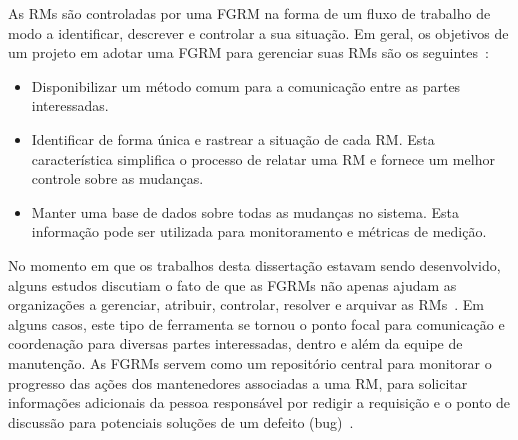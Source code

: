 
As RMs são controladas por uma FGRM na forma de um fluxo de trabalho de modo a
identificar, descrever e controlar a sua situação. Em geral, os objetivos de um
projeto em adotar uma FGRM para gerenciar suas RMs são os
seguintes~\cite{tripathy2014software}:

\begin{itemize}
    \item Disponibilizar um método comum para a comunicação entre as partes
        interessadas.
	\item Identificar de forma única e rastrear a situação de cada RM\@. Esta
		característica simplifica o processo de relatar uma RM e fornece um
		melhor controle sobre as mudanças.
    \item Manter uma base de dados sobre todas as mudanças no sistema. Esta
        informação pode ser utilizada para monitoramento e métricas de medição.
\end{itemize}

No momento em que os trabalhos desta dissertação estavam sendo desenvolvido,
alguns estudos discutiam o fato de que as FGRMs não apenas ajudam as
organizações a gerenciar, atribuir, controlar, resolver e arquivar as
RMs~\cite{Bertram:2010:CCB:1718918.1718972}.  Em alguns casos, este tipo de
ferramenta se tornou o ponto focal para comunicação e coordenação para diversas
partes interessadas, dentro e além da equipe de manutenção. As FGRMs servem como
um repositório central para monitorar o progresso das ações dos mantenedores
associadas a uma RM, para solicitar informações adicionais da pessoa responsável
por redigir a requisição e o ponto de discussão para potenciais soluções de um
defeito (bug)~\cite{zimmermann2009improving}.

